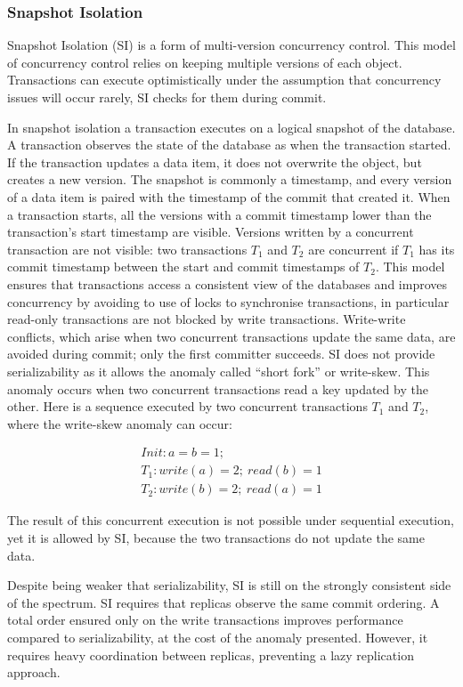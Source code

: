 \documentclass[11pt]{article}
\begin{document}
\subsubsection{Snapshot Isolation}
Snapshot Isolation (SI) \cite{Berenson95} is a form of multi-version
concurrency control. This model of concurrency control relies on keeping
multiple versions of each object. Transactions can execute optimistically
under the assumption that concurrency issues will occur rarely, SI checks for
them during commit.

In snapshot isolation a transaction executes on a logical snapshot of the
database. A transaction observes the state of the database as when the
transaction started. If the transaction updates a data item, it does not
overwrite the object, but creates a new version. The snapshot is commonly a
timestamp, and every version of a data item is paired with the timestamp of
the commit that created it. When a transaction starts, all the versions with a
commit timestamp lower than the transaction's start timestamp are visible.
Versions written by a concurrent transaction are not visible: two transactions
$T_1$ and $T_2$ are concurrent if $T_1$ has its commit timestamp between the
start and commit timestamps of $T_2$. This model ensures that transactions
access a consistent view of the databases and improves concurrency by avoiding
to use of locks to synchronise transactions, in particular read-only
transactions are not blocked by write transactions. Write-write conflicts,
which arise when two concurrent transactions update the same data, are avoided
during commit; only the first committer succeeds. SI does not provide
serializability as it allows the anomaly called ``short fork'' or write-skew.
This anomaly occurs when two concurrent transactions read a key updated by the
other. Here is a sequence executed by two concurrent transactions $T_1$ and
$T_2$, where the write-skew anomaly can occur:

\begin{gather}
Init: a = b = 1; \\
T_1: write(a) = 2;\ read(b) = 1 \\
T_2: write(b) = 2;\ read(a) = 1
\end{gather}

The result of this concurrent execution is not possible under sequential
execution, yet it is allowed by SI, because the two transactions do not
update the same data.

Despite being weaker that serializability, SI is still on the strongly
consistent side of the spectrum. SI requires that replicas observe the same
commit ordering. A total order ensured only on the write transactions improves
performance compared to serializability, at the cost of the anomaly presented.
However, it requires heavy coordination between replicas, preventing a lazy
replication approach.
\end{document}
